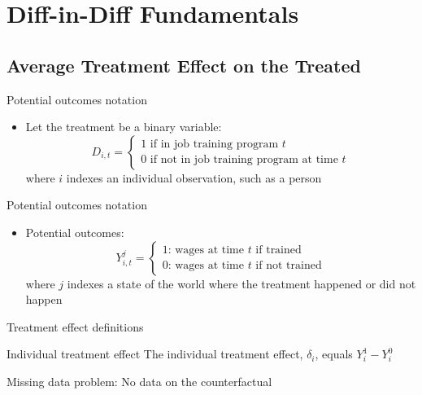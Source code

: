 \documentclass{beamer}
\begin{document}
\section{Diff-in-Diff Fundamentals}

\subsection{Average Treatment Effect on the Treated}








\begin{frame}{Potential outcomes notation}

	\begin{itemize}
	\item Let the treatment be a binary variable: $$D_{i,t} =\begin{cases} 1 \text{ if in job training program $t$} \\ 0 \text{ if not in job training program at time $t$} \end{cases}$$where $i$ indexes an individual observation, such as a person

	\end{itemize}
\end{frame}

\begin{frame}{Potential outcomes notation}

	\begin{itemize}

	\item Potential outcomes: $$Y_{i,t}^j =\begin{cases} 1 \text{: wages at time $t$ if trained} \\ 0 \text{: wages at time $t$ if not trained} \end{cases}$$where $j$ indexes a state of the world where the treatment happened or did not happen

	\end{itemize}
\end{frame}



\begin{frame}{Treatment effect definitions}


	\begin{block}{Individual treatment effect}
	    The individual treatment effect,  $\delta_i$, equals $Y_i^1-Y_i^0$
	\end{block}

Missing data problem:  No data on the counterfactual

\end{frame}
\end{document}
